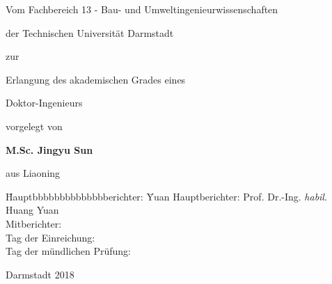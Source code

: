 %

\begin{titlepage}                  %
\renewcommand{\baselinestretch}{1.0}
\begin{center}

    {\bf\huge{} \par}
    {\bf\huge{} \par}
    {\bf\huge{} \par}
\vspace*{15mm}

    {{Vom Fachbereich 13 - Bau- und Umweltingenieurwissenschaften\par}}
\vspace*{2mm}
    {{der Technischen Universit\"{a}t Darmstadt \par}}


\vspace*{15mm}
    {{zur \par}}
\vspace*{2mm}
    {{Erlangung des akademischen Grades eines \par}}
\vspace*{2mm}
    {{Doktor-Ingenieurs \par}}


\vspace*{10mm}
    {{vorgelegt von} \par}
\vspace*{2mm}
    {{\large \bf M.Sc. Jingyu Sun} \par}
\vspace*{2mm}
    {{aus Liaoning \par}}

\vspace*{2mm}

\vspace*{28mm}
\vspace*{10mm}

{
\begin{tabbing}
\hspace*{23mm}
\=Hauptbbbbbbbbbbbbbberichter: \=Yuan\kill
\>Hauptberichter: \>Prof. Dr.-Ing. \emph{habil}. Huang Yuan\\
\>Mitberichter: \>\\
\>Tag der Einreichung:\>\\
\>Tag der m\"{u}ndlichen Pr\"{u}fung:\>\\
\end{tabbing}
}

\vspace*{10mm}
	{{Darmstadt 2018}}



\end{center}

\end{titlepage}
